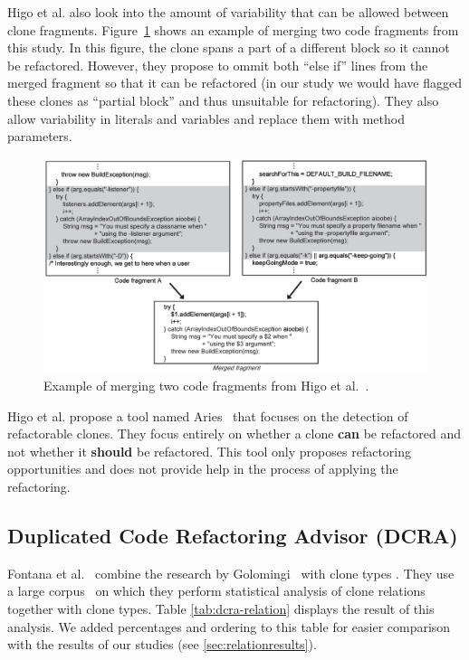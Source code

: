 Higo et al. also look into the amount of variability that can be allowed between clone fragments. Figure~\ref{fig:higomerge} shows an example of merging two code fragments from this study. In this figure, the clone spans a part of a different block so it cannot be refactored. However, they propose to ommit both ``else if'' lines from the merged fragment so that it can be refactored (in our study we would have flagged these clones as ``partial block'' and thus unsuitable for refactoring). They also allow variability in literals and variables and replace them with method parameters.

\begin{figure}[H]
  \includegraphics[width=1\textwidth]{img/higo}
  \caption{Example of merging two code fragments from Higo et al.~\cite{higo2008metric}.}
  \label{fig:higomerge}
\end{figure}

Higo et al. propose a tool named Aries~\cite{higo2004aries, higo2008metric} that focuses on the detection of refactorable clones. They focus entirely on whether a clone \textbf{can} be refactored and not whether it \textbf{should} be refactored. This tool only proposes refactoring opportunities and does not provide help in the process of applying the refactoring.

\subsection{Duplicated Code Refactoring Advisor (DCRA)}
Fontana et al.~\cite{fontana2012duplicated, fontana2015duplicated} combine the research by Golomingi~\cite{koni2001scenario} with clone types \cite{roy2007survey}. They use a large corpus~\cite{tempero2010qualitas} on which they perform statistical analysis of clone relations together with clone types. Table \ref{tab:dcra-relation} displays the result of this analysis. We added percentages and ordering to this table for easier comparison with the results of our studies (see \ref{sec:relationresults}).

